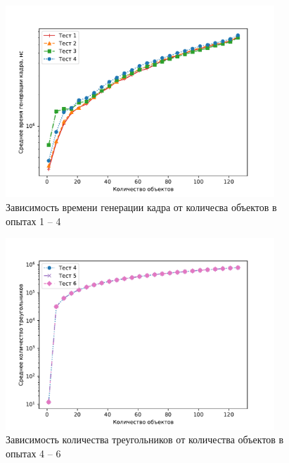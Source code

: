 \begin{figure}[H]
	\centering
    \includegraphics[width=0.9\textwidth]{img/1234/plot_time.pdf}
	\caption{Зависимость времени генерации кадра от количесва объектов в опытах 1 -- 4}
	\label{fig:1234:time}
\end{figure}

\begin{figure}[H]
	\centering
    \includegraphics[width=0.9\textwidth]{img/456/plot_triangles.pdf}
	\caption{Зависимость количества треугольников от количества объектов в опытах 4 -- 6}
	\label{fig:456:tr}
\end{figure}


